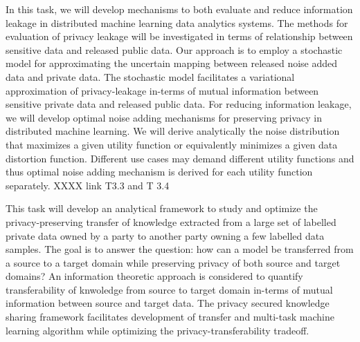\begin{Workpackage}{\thewpno}
\begin{Task}
  \TaskResults{%
  }
  \TaskHeader{}
  In this task, we will develop mechanisms to both evaluate and reduce information leakage in distributed machine learning data analytics systems. The methods for evaluation of privacy leakage will be investigated in terms of relationship between sensitive data and released public data. Our approach is to employ a stochastic model for approximating the uncertain mapping between released noise added data and private data. The stochastic model facilitates a variational approximation of privacy-leakage in-terms of mutual information between sensitive private data and released public data. For reducing information leakage, we will develop optimal noise adding mechanisms for preserving privacy in distributed machine learning. We will derive analytically the noise distribution that maximizes a given utility function or equivalently minimizes a given data distortion function. Different use cases may demand different utility functions and thus optimal noise adding mechanism is derived for each utility function separately.    XXXX link T3.3 and T 3.4
 \end{Task}

 \begin{Task}
  
  \TaskResults{%
  }
  \TaskHeader{}
  This task will develop an analytical framework to study and optimize the privacy-preserving transfer of knowledge extracted from a large set of labelled private data owned by a party to another party owning a few labelled data samples. The goal is to answer the question: how can a model be transferred from a source to a target domain while preserving privacy of both source and target domains? An information theoretic approach is considered to quantify transferability of knwoledge from source to target domain in-terms of mutual information between source and target data. The privacy secured knowledge sharing framework facilitates development of transfer and multi-task machine learning algorithm while optimizing the privacy-transferability tradeoff.
 \end{Task}

 \begin{Task}
  

\end{Task}
\end{Workpackage}
